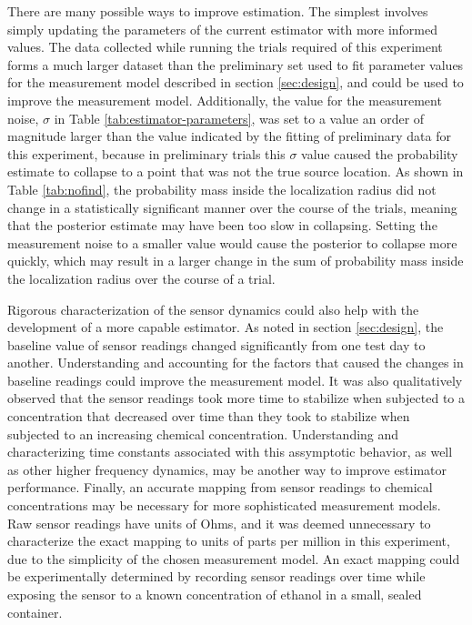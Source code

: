 \documentclass[submit, 12pt]{aiaa-pretty-modified}
\begin{document}
There are many possible ways to improve estimation. The simplest
involves simply updating the parameters of the current estimator with more
informed values. The data collected
while running the trials required of this experiment forms a much larger dataset than the
preliminary set used to fit parameter values for the measurement model
described in section \ref{sec:design}, and could be used to improve
the measurement model.  Additionally, the value for the measurement noise, $\sigma$ in Table
\ref{tab:estimator-parameters}, was set to a value an order of magnitude larger
than the value indicated by the fitting of preliminary data for this experiment, because in preliminary trials
this $\sigma$ value caused the probability
estimate to collapse to a point that was not the true source location. As shown in Table \ref{tab:nofind},
the probability mass inside the localization radius did not change in a
statistically significant manner over the course of the trials,
meaning that the posterior estimate may have been
too slow in collapsing.  Setting the measurement noise to a smaller
value would cause the posterior to collapse more quickly, which may
result in a larger change in the sum of probability mass inside the
localization radius over the course of a trial.

Rigorous characterization of the sensor dynamics could also help with
the development of a more capable estimator. As
noted in section \ref{sec:design}, the baseline value of sensor
readings changed significantly from one test day to another. Understanding and accounting
for the factors that caused the changes in baseline readings could
improve the measurement model. It was also qualitatively observed that
the sensor readings took more time to stabilize when subjected to a
concentration that decreased over time than they took to stabilize
when subjected to an increasing chemical concentration. Understanding and
characterizing time constants associated with this assymptotic
behavior, as well as other higher frequency dynamics, may be another
way to improve estimator performance. Finally, an
accurate mapping from sensor readings to chemical concentrations may be
necessary for more sophisticated measurement models.  Raw sensor
readings have units of Ohms, and it was deemed unnecessary to
characterize the exact mapping to units of parts per million in this
experiment, due to the simplicity of the chosen measurement model.  An
exact mapping could be
experimentally determined by recording sensor readings over time while
exposing the sensor to a known concentration of ethanol in a small, sealed
container. 
\end{document}

